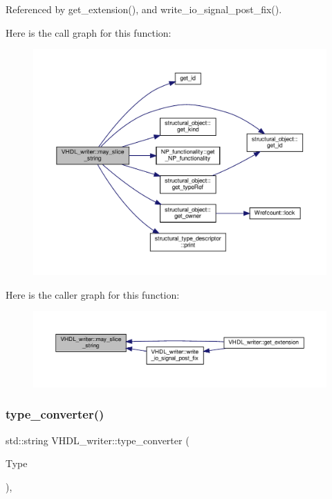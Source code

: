 Referenced by get\+\_\+extension(), and write\+\_\+io\+\_\+signal\+\_\+post\+\_\+fix().

Here is the call graph for this function\+:
\nopagebreak
\begin{figure}[H]
\begin{center}
\leavevmode
\includegraphics[width=350pt]{d0/d0c/structVHDL__writer_a8fe8a416efdb306d8f290e0a4b7faef8_cgraph}
\end{center}
\end{figure}
Here is the caller graph for this function\+:
\nopagebreak
\begin{figure}[H]
\begin{center}
\leavevmode
\includegraphics[width=350pt]{d0/d0c/structVHDL__writer_a8fe8a416efdb306d8f290e0a4b7faef8_icgraph}
\end{center}
\end{figure}
\mbox{\label{structVHDL__writer_aaadfd937b71dd556923b7e20e18cab60}} 
\subsubsection{\texorpdfstring{type\+\_\+converter()}{type\_converter()}}
{\footnotesize\ttfamily std\+::string V\+H\+D\+L\+\_\+writer\+::type\+\_\+converter (\begin{DoxyParamCaption}\item[{\hyperlink{structural__objects_8hpp_a219296792577e3292783725961506c83}{structural\+\_\+type\+\_\+descriptor\+Ref}}]{Type }\end{DoxyParamCaption})\hspace{0.3cm}{\ttfamily [override]}, {\ttfamily [virtual]}}



